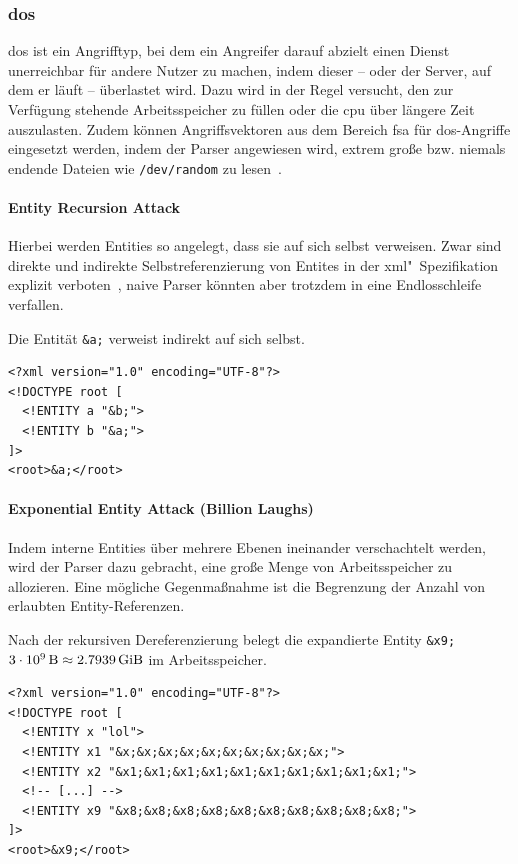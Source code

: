 \subsubsection{\acrfull{dos}}
\label{sec:xmlattacks-dos}

\acrlong{dos} ist ein Angrifftyp, bei dem ein Angreifer darauf abzielt einen Dienst unerreichbar für andere Nutzer zu machen, indem dieser -- oder der Server, auf dem er läuft -- überlastet wird. Dazu wird in der Regel versucht, den zur Verfügung stehende Arbeitsspeicher zu füllen oder die \acrshort{cpu} über längere Zeit auszulasten. Zudem können Angriffsvektoren aus dem Bereich \acrlong{fsa} für \acrshort{dos}-Angriffe eingesetzt werden, indem der Parser angewiesen wird, extrem große bzw. niemals endende Dateien wie \texttt{/dev/random} zu lesen~\cite[S.~13]{morgan2014xml}.

\paragraph{Entity Recursion Attack}
Hierbei werden Entities so angelegt, dass sie auf sich selbst verweisen. Zwar sind direkte und indirekte Selbstreferenzierung von Entites in der \acrshort{xml}"~Spezifikation explizit verboten~\cite[Abschnitt 4.1]{maler2008xml}, naive Parser könnten aber trotzdem in eine Endlosschleife verfallen.

\begin{example} Die Entität \texttt{&a;} verweist indirekt auf sich selbst.
    \begin{verbatim}
<?xml version="1.0" encoding="UTF-8"?>
<!DOCTYPE root [
  <!ENTITY a "&b;">
  <!ENTITY b "&a;">
]>
<root>&a;</root>
    \end{verbatim}
\end{example}

\paragraph{Exponential Entity Attack (Billion Laughs)}
Indem interne Entities über mehrere Ebenen ineinander verschachtelt werden, wird der Parser dazu gebracht, eine große Menge von Arbeitsspeicher zu allozieren. Eine mögliche Gegenmaßnahme ist die Begrenzung der Anzahl von erlaubten Entity-Referenzen.

\begin{example} Nach der rekursiven Dereferenzierung belegt die expandierte Entity \texttt{&x9;} $\SI[parse-numbers=false]{3 \cdot 10^9}{\byte}\approx \SI{2.7939}{\gibi\byte}$ im Arbeitsspeicher.
    \begin{verbatim}
<?xml version="1.0" encoding="UTF-8"?>
<!DOCTYPE root [
  <!ENTITY x "lol">
  <!ENTITY x1 "&x;&x;&x;&x;&x;&x;&x;&x;&x;&x;">
  <!ENTITY x2 "&x1;&x1;&x1;&x1;&x1;&x1;&x1;&x1;&x1;&x1;">
  <!-- [...] -->
  <!ENTITY x9 "&x8;&x8;&x8;&x8;&x8;&x8;&x8;&x8;&x8;&x8;">
]>
<root>&x9;</root>
    \end{verbatim}
\end{example}

